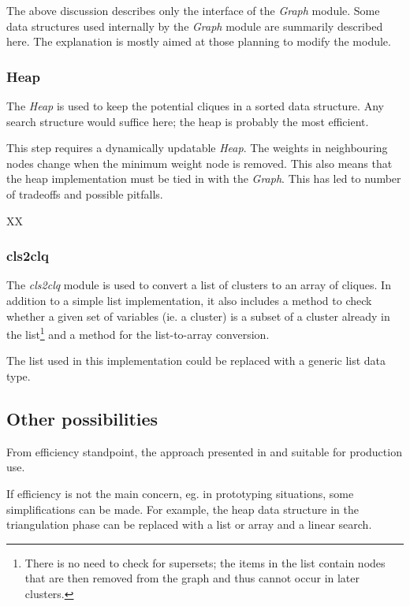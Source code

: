 \documentclass[12pt,a4paper]{report}
\newcommand{\cdatatype}[1]{{\it #1}}
\begin{document}
The above discussion describes only the interface of the
\cdatatype{Graph} module. Some data structures used internally by the
\cdatatype{Graph} module are summarily described here. The explanation
is mostly aimed at those planning to modify the module.

\subsubsection{Heap}

The \cdatatype{Heap} is used to keep the potential cliques in a sorted
data structure. Any search structure would suffice here; the heap is
probably the most efficient.

This step requires a dynamically updatable \cdatatype{Heap}. The
weights in neighbouring nodes change when the minimum weight node is
removed. This also means that the heap implementation must be tied in
with the \cdatatype{Graph}. This has led to number of tradeoffs and
possible pitfalls.

 
XX


\subsubsection{cls2clq}

The \cdatatype{cls2clq} module is used to convert a list of clusters
to an array of cliques. In addition to a simple list implementation,
it also includes a method to check whether a given set of variables
(ie. a cluster) is a subset of a cluster already in the
list\footnote{There is no need to check for supersets; the items in
the list contain nodes that are then removed from the graph and thus
cannot occur in later clusters.} and a method for the list-to-array
conversion.

The list used in this implementation could be replaced with a generic
list data type.

\subsection{Other possibilities}

From efficiency standpoint, the approach presented in \cite{huang1994}
and suitable for production use.

If efficiency is not the main concern, eg. in prototyping situations,
some simplifications can be made. For example, the heap data structure
in the triangulation phase can be replaced with a list or array and a
linear search.
\end{document}

